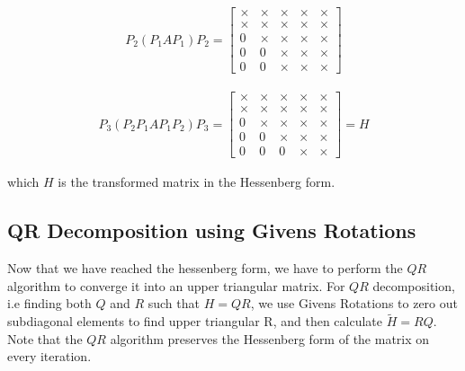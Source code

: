 \documentclass[12pt]{article}
\numberwithin{equation}{section}
\newcommand{\brak}[1]{\ensuremath{\left(#1\right)}}
\begin{document}
\begin{align}
P_2 \brak{P_1 A P_1} P_2 = \begin{bmatrix}
\times & \times & \times & \times & \times\\
\times & \times & \times & \times & \times\\
0 & \times & \times & \times & \times\\
0 & 0 & \times & \times & \times\\
0 & 0 & \times & \times & \times
\end{bmatrix}
\end{align}

\begin{align}
P_3 \brak{P_2 P_1 A P_1 P_2} P_3 = \begin{bmatrix}
\times & \times & \times & \times & \times\\
\times & \times & \times & \times & \times\\
0 & \times & \times & \times & \times\\
0 & 0 & \times & \times & \times\\
0 & 0 & 0 & \times & \times
\end{bmatrix} = H
\end{align}

which $H$ is the transformed matrix in the Hessenberg form.

\subsection{QR Decomposition using Givens Rotations}
Now that we have reached the hessenberg form, we have to perform the $QR$ algorithm to converge it into an upper triangular matrix.
For $QR$ decomposition, i.e finding both $Q$ and $R$ such that $H = QR$, we use Givens Rotations to zero out subdiagonal elements to find upper triangular R, and then calculate $\tilde{H} = RQ$.
Note that the $QR$ algorithm preserves the Hessenberg form of the matrix on every iteration.
\newline
\end{document}
